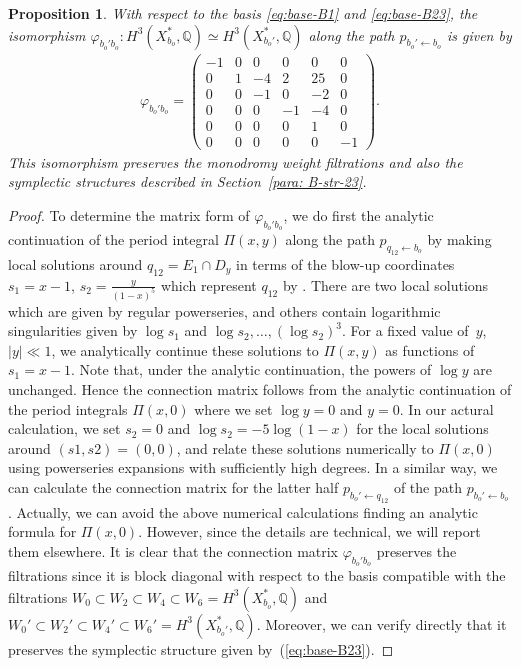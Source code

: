 \documentclass[pdftex]{sigma}
\numberwithin{equation}{section}
\newtheorem{Proposition}[Theorem]{Proposition}
\begin{document}
\begin{Proposition}\label{prop:connect-phi-21}With respect to the basis \eqref{eq:base-B1} and \eqref{eq:base-B23}, the isomorphism $\varphi_{b_{o}'b_{o}}\colon H^{3}(X_{b_{o}}^{*},\mathbb{Q})\simeq H^{3}(X_{b_{o}'}^{*},\mathbb{Q})$ along the path $p_{b_{o}'\leftarrow b_{o}}$ is given by
\begin{gather*}
\varphi_{b_{o}'b_{o}}=\left(\begin{matrix}-1 & 0 & 0 & 0 & 0 & 0\\
0 & 1 & -4 & 2 & 25 & 0\\
0 & 0 & -1 & 0 & -2 & 0\\
0 & 0 & 0 & -1 & -4 & 0\\
0 & 0 & 0 & 0 & 1 & 0\\
0 & 0 & 0 & 0 & 0 & -1
\end{matrix}\right).
\end{gather*}
This isomorphism preserves the monodromy weight filtrations and also the symplectic structures described in Section~{\rm \ref{para: B-str-23}}. \end{Proposition}

\begin{proof} To determine the matrix form of $\varphi_{b_{o}'b_{o}}$, we do first the analytic continuation of the period integral $\Pi(x,y)$ along
the path $p_{q_{12}\leftarrow b_{o}}$ by making local solutions around $q_{12}=E_{1}\cap D_{y}$ in terms of the blow-up coordinates $s_{1}=x-1$, $s_{2}=\frac{y}{(1-x)^{5}}$ which represent $q_{12}$ by . There are two local solutions which are given by regular powerseries, and others contain logarithmic singularities given by $\log s_{1}$ and $\log s_{2},\dots,(\log s_{2})^{3}$. For a fixed value of~$y$, $|y|\ll1$, we analytically continue these solutions to $\Pi(x,y)$ as functions of $s_{1}=x-1$. Note that, under the analytic continuation, the powers of $\log y$ are unchanged. Hence the connection matrix follows from the analytic continuation of the period integrals $\Pi(x,0)$ where we set $\log y=0$ and $y=0$. In our actural calculation, we set $s_{2}=0$ and $\log s_{2}=-5\log(1-x)$ for the local solutions around $(s1,s2)=(0,0)$, and relate these solutions numerically to $\Pi(x,0)$ using powerseries expansions with sufficiently high degrees. In a similar way, we can calculate the connection matrix for the latter half $p_{b_{o}'\leftarrow q_{12}}$ of the path $p_{b_{o}'\leftarrow b_{o}}$. Actually, we can avoid the above numerical calculations finding an analytic formula for $\Pi(x,0)$. However, since the details are technical, we will report them elsewhere. It is clear that the connection matrix $\varphi_{b_{o}'b_{o}}$ preserves the filtrations since it is block diagonal with respect to the basis compatible with the filtrations $W_{0}\subset W_{2}\subset W_{4}\subset W_{6}=H^{3}(X_{b_{o}}^{*},\mathbb{Q})$ and $W_{0}'\subset W_{2}'\subset W_{4}'\subset W_{6}'=H^{3}(X_{b_{o}'}^{*},\mathbb{Q})$. Moreover, we can verify directly that it preserves the symplectic structure given by~(\ref{eq:base-B23}).
\end{proof}
\end{document}
